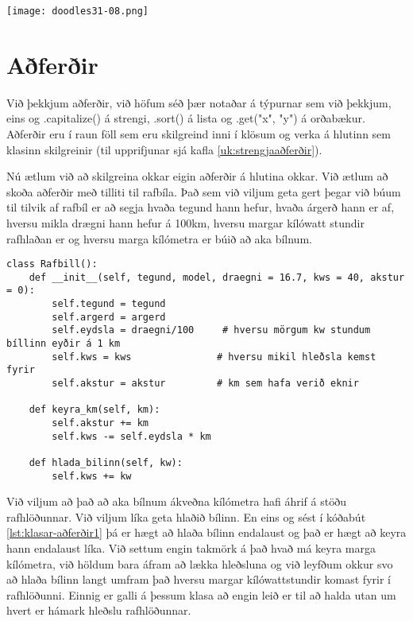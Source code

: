 \phantom{easter egg}
\begin{center}
	\texttt{[image: doodles31-08.png]}
\end{center}

\section{Aðferðir}\label{uk:klasar-aðferðir}
Við þekkjum aðferðir, við höfum séð þær notaðar á týpurnar sem við þekkjum, eins og .capitalize() á strengi, .sort() á lista og .get("x", "y") á orðabækur.
Aðferðir eru í raun föll sem eru skilgreind inni í klösum og verka á hlutinn sem klasinn skilgreinir (til upprifjunar sjá kafla \ref{uk:strengjaaðferðir}).

Nú ætlum við að skilgreina okkar eigin aðferðir á hlutina okkar.
Við ætlum að skoða aðferðir með tilliti til rafbíla.
Það sem við viljum geta gert þegar við búum til tilvik af rafbíl er að segja hvaða tegund hann hefur, hvaða árgerð hann er af, hversu mikla drægni hann hefur á 100km, hversu margar kílówatt stundir rafhlaðan er og hversu marga kílómetra er búið að aka bílnum.

\begin{lstlisting}[caption=Klasa aðferðir á rafbílaklasa, label=lst:klasar-aðferðir1]
class Rafbill():
	def __init__(self, tegund, model, draegni = 16.7, kws = 40, akstur = 0):
		self.tegund = tegund     
		self.argerd = argerd        
		self.eydsla = draegni/100     # hversu mörgum kw stundum bíllinn eyðir á 1 km
		self.kws = kws               # hversu mikil hleðsla kemst fyrir
		self.akstur = akstur         # km sem hafa verið eknir

	def keyra_km(self, km):
		self.akstur += km
		self.kws -= self.eydsla * km  

	def hlada_bilinn(self, kw):
		self.kws += kw
\end{lstlisting}

Við viljum að það að aka bílnum ákveðna kílómetra hafi áhrif á stöðu rafhlöðunnar.
Við viljum líka geta hlaðið bílinn.
En eins og sést í kóðabút \ref{lst:klasar-aðferðir1} þá er hægt að hlaða bílinn endalaust og það er hægt að keyra hann endalaust líka.
Við settum engin takmörk á það hvað má keyra marga kílómetra, við höldum bara áfram að lækka hleðsluna og við leyfðum okkur svo að hlaða bílinn langt umfram það hversu margar kílówattstundir komast fyrir í rafhlöðunni.
Einnig er galli á þessum klasa að engin leið er til að halda utan um hvert er hámark hleðslu rafhlöðunnar.

